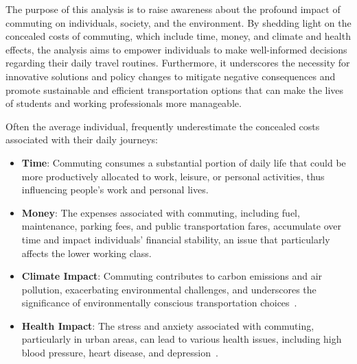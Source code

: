 The purpose of this analysis is to raise awareness about the profound impact of commuting on individuals, society, and
the environment.
By shedding light on the concealed costs of commuting, which include time, money, and climate and health effects, the
analysis aims to empower individuals to make well-informed decisions regarding their daily travel routines.
Furthermore, it underscores the necessity for innovative solutions and policy changes to mitigate negative consequences
and promote sustainable and efficient transportation options that can make the lives of students and working
professionals more manageable.

Often the average individual, frequently underestimate the concealed costs associated with their daily journeys:

\begin{itemize}
    \item \textbf{Time}: Commuting consumes a substantial portion of daily life that could be more productively
    allocated to work, leisure, or personal activities, thus influencing people's work and personal lives.
    \item \textbf{Money}: The expenses associated with commuting, including fuel, maintenance, parking fees, and public
    transportation fares, accumulate over time and impact individuals' financial stability, an issue that particularly
    affects the lower working class.
    \item \textbf{Climate Impact}: Commuting contributes to carbon emissions and air pollution, exacerbating
    environmental challenges, and underscores the significance of environmentally conscious transportation
    choices~\cite{alma9921355859805762}.
    \item \textbf{Health Impact}: The stress and anxiety associated with commuting, particularly in urban areas, can
    lead to various health issues, including high blood pressure, heart disease, and
    depression~\cite{commuting-and-your-health}.
\end{itemize}
